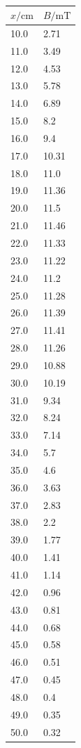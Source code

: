 \documentclass[11pt,ngerman,a4paper]{article}
\begin{document}
\begin{table}
\centering
\begin{tabular}{ll}
\toprule
{$x / \si{\centi\meter}$} &{ $B/\si{\milli\tesla}$ }\\
\midrule
10.0 & 2.71\\
11.0 & 3.49\\
12.0 & 4.53\\
13.0 & 5.78\\
14.0 & 6.89\\
15.0 & 8.2\\
16.0 & 9.4\\
17.0 & 10.31\\
18.0 & 11.0\\
19.0 & 11.36\\
20.0 & 11.5\\
21.0 & 11.46\\
22.0 & 11.33\\
23.0 & 11.22\\
24.0 & 11.2\\
25.0 & 11.28\\
26.0 & 11.39\\
27.0 & 11.41\\
28.0 & 11.26\\
29.0 & 10.88\\
30.0 & 10.19\\
31.0 & 9.34\\
32.0 & 8.24\\
33.0 & 7.14\\
34.0 & 5.7\\
35.0 & 4.6\\
36.0 & 3.63\\
37.0 & 2.83\\
38.0 & 2.2\\
39.0 & 1.77\\
40.0 & 1.41\\
41.0 & 1.14\\
42.0 & 0.96\\
43.0 & 0.81\\
44.0 & 0.68\\
45.0 & 0.58\\
46.0 & 0.51\\
47.0 & 0.45\\
48.0 & 0.4\\
49.0 & 0.35\\
50.0 & 0.32\\
\bottomrule
\end{tabular}
\label{}
\caption{}
\end{table}
\end{document}
